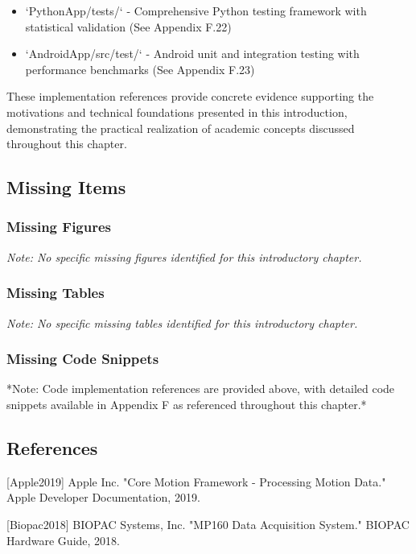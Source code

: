 \documentclass[12pt,a4paper]{article}
\begin{document}
\begin{itemize}
\item `PythonApp/tests/` - Comprehensive Python testing framework with statistical validation (See Appendix F.22)
\item `AndroidApp/src/test/` - Android unit and integration testing with performance benchmarks (See Appendix F.23)

\end{itemize}
These implementation references provide concrete evidence supporting the motivations and technical foundations presented
in this introduction, demonstrating the practical realization of academic concepts discussed throughout this chapter.

\subsection{Missing Items}

\subsubsection{Missing Figures}

\textit{Note: No specific missing figures identified for this introductory chapter.}

\subsubsection{Missing Tables}

\textit{Note: No specific missing tables identified for this introductory chapter.}

\subsubsection{Missing Code Snippets}

*Note: Code implementation references are provided above, with detailed code snippets available in Appendix F as
referenced throughout this chapter.*

\subsection{References}

[Apple2019] Apple Inc. "Core Motion Framework - Processing Motion Data." Apple Developer Documentation, 2019.

[Biopac2018] BIOPAC Systems, Inc. "MP160 Data Acquisition System." BIOPAC Hardware Guide, 2018.
\end{document}
